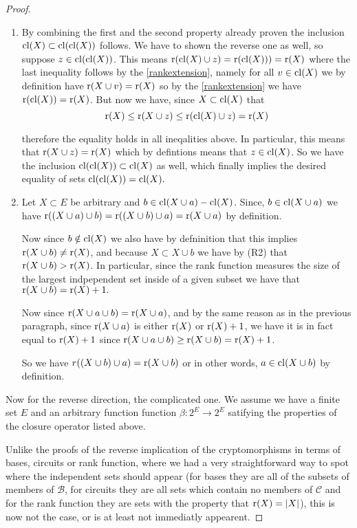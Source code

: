 \begin{proof}
\begin{enumerate}
        \item By combining the first and the second property already proven the inclusion $\mathrm{cl}(X) \subset \mathrm{cl}(\mathrm{cl}(X))$  follows. We have to shown the reverse one as well, so suppose $z\in \mathrm{cl}(\mathrm{cl}(X))$. This means $\text{r}(\mathrm{cl}(X) \cup z)= \text{r}(\mathrm{cl}(X))) = \text{r}(X)$ where the last inequality follows by the \ref{rankextension}, namely for all $v \in \mathrm{cl}(X)$ we by definition have $\text{r}(X \cup v) = \text{r}(X)$ so by the \ref{rankextension} we have $\text{r}(\mathrm{cl}(X)) = \text{r}(X)$. But now we have, since $X \subset \mathrm{cl}(X)$ that $$\text{r}(X) \leq \text{r}(X \cup z) \leq \text{r}(\mathrm{cl}(X)\cup z) = \text{r}(X)$$

       therefore the equality holds in all ineqalities above. In particular, this means that $\text{r}(X \cup z) = \text{r}(X)$ which by defintions means that $z \in \mathrm{cl}(X)$. So we have the inclusion $ \mathrm{cl}(\mathrm{cl}(X))\subset \mathrm{cl}(X)$ as well, which finally implies the desired equality of sets $\mathrm{cl}(\mathrm{cl}(X))= \mathrm{cl}(X).$

        \item Let $X \subset E$ be arbitrary and $b \in \mathrm{cl}(X \cup a) - \mathrm{cl}(X)$. Since, $b \in \mathrm{cl}(X \cup a)$ we have $\text{r}((X\cup a)\cup b) = \text{r}((X\cup b) \cup a) = \text{r}(X \cup a)$ by definition. 

        Now since $b \notin \mathrm{cl}(X)$ we also have by defninition that this implies $\text{r}(X \cup b)\neq \text{r}(X)$, and because $X \subset X \cup b$ we have by (R2) that $\text{r}(X \cup b) > \text{r}(X)$. In particular, since the rank function measures the size of the largest indpependent set inside of a given subset we have that $\text{r}(X \cup b) = \text{r}(X)+1.$ 

        Now since $\text{r}(X \cup a \cup b) = \text{r}(X \cup a)$, and by the same reason as in the previous paragraph, since $\text{r}(X \cup a)$ is either $\text{r}(X)$ or $\text{r}(X) + 1$, we have it is in fact equal to $\text{r}(X) + 1$ since $\text{r}(X \cup a \cup b) \geq \text{r}(X \cup b)= \text{r}(X) + 1$.

        So we have $r((X\cup b) \cup a) = \text{r}(X \cup b)$ or in other words, $a \in \mathrm{cl}(X \cup b)$ by definition.
       
        \end{enumerate}



    Now for the reverse direction, the complicated one. We assume we have a finite set $E$ and an arbitrary function function $\beta : 2^E \to 2^E$ satifying the properties of the closure operator listed above.

    Unlike the proofs of the reverse implication of the cryptomorphisms in terms of bases, circuits or rank function, where we had a very straightforward way to spot where the independent sets should appear (for bases they are all of the subsets of members of $\mathcal{B}$, for circuits they are all sets which contain no members of $\mathcal{C}$ and for the rank function they are sets with the property that $\text{r}(X) = |X|$), this is now not the case, or is at least not immediatly appearent.


\end{proof}
